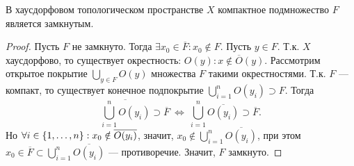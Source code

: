 \begin{lemma}
    В хаусдорфовом топологическом пространстве $X$ компактное подмножество $F$ является замкнутым.
\end{lemma}
\begin{proof}
    Пусть $F$ не замкнуто. Тогда $\exists x_0 \in \overline{F}: x_0 \notin F$. Пусть $y \in F$. Т.к. $X$ хаусдорфово, то существует окрестность: $O(y): x \notin \overline{O}(y)$. Рассмотрим открытое покрытие $\bigcup_{y \in F} O(y)$ множества $F$ такими окрестностями. Т.к. $F$ --- компакт, то существует конечное подпокрытие $\bigcup_{i = 1}^{n} O(y_i) \supset F$. Тогда
    \[
        \overline{\bigcup_{i = 1}^{n} O(y_i)} \supset \overline{F} \ \Longleftrightarrow \ \bigcup_{i = 1}^{n} \overline{O(y_i)} \supset \overline{F}.
    \]
    Но $\forall i \in \left\{1, \ldots, n\right\}: x_0 \notin \overline{O(y_i)}$, значит, $x_0 \notin \bigcup_{i = 1}^{n} \overline{O(y_i)}$, при этом $x_0 \in \overline{F} \subset \bigcup_{i = 1}^{n} \overline{O(y_i)}$ --- противоречие. Значит, $F$ замкнуто.
\end{proof}